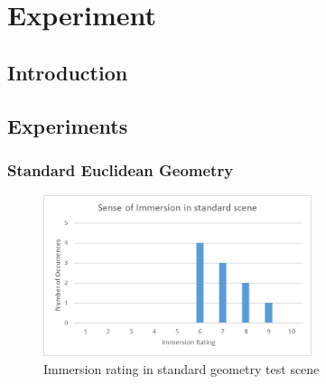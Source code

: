 \chapter{Experiment}
\label{exp}
\begin{multicols*}{2}

	\section{Introduction}
	\label{exp:intro}


	\section{Experiments}
	\label{exp:exp}

		\subsection{Standard Euclidean Geometry}
		\label{exp:exp:standard}


			\end{multicols*}
			\begin{figure}
				\label{exp:fig:standard_immersion}
				\includegraphics[width=0.7\textwidth]{Images/Standard_Immersion}
				\centering
				\caption{Immersion rating in standard geometry test scene}
			\end{figure}

